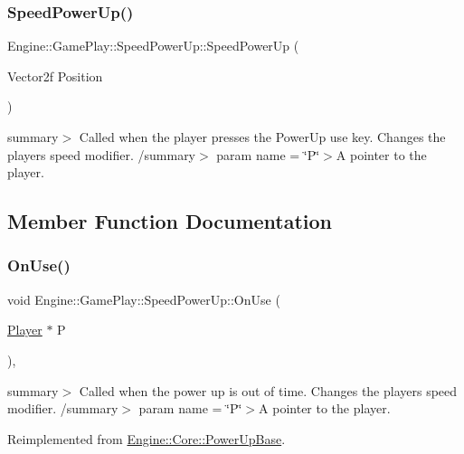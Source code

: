 \subsubsection{\texorpdfstring{Speed\+Power\+Up()}{SpeedPowerUp()}}
{\footnotesize\ttfamily Engine\+::\+Game\+Play\+::\+Speed\+Power\+Up\+::\+Speed\+Power\+Up (\begin{DoxyParamCaption}\item[{Vector2f}]{Position }\end{DoxyParamCaption})}

summary$>$ Called when the player presses the Power\+Up use key. Changes the players speed modifier. /summary$>$ param name = \char`\"{}\+P\char`\"{}$>$A pointer to the player.

\subsection{Member Function Documentation}
\mbox{\label{class_engine_1_1_game_play_1_1_speed_power_up_a0901961fb01656a2b81ccf846e370e31}} 
\subsubsection{\texorpdfstring{On\+Use()}{OnUse()}}
{\footnotesize\ttfamily void Engine\+::\+Game\+Play\+::\+Speed\+Power\+Up\+::\+On\+Use (\begin{DoxyParamCaption}\item[{\hyperlink{class_engine_1_1_game_play_1_1_player}{Player} $\ast$}]{P }\end{DoxyParamCaption})\hspace{0.3cm}{\ttfamily [override]}, {\ttfamily [virtual]}}

summary$>$ Called when the power up is out of time. Changes the players speed modifier. /summary$>$ param name = \char`\"{}\+P\char`\"{}$>$A pointer to the player.

Reimplemented from \hyperlink{class_engine_1_1_core_1_1_power_up_base_a1c93516694b752a8ebc42eb181cb2b78}{Engine\+::\+Core\+::\+Power\+Up\+Base}.

\mbox{\label{class_engine_1_1_game_play_1_1_speed_power_up_ad305e70493c2b51a87e58d58cea73521}} 
